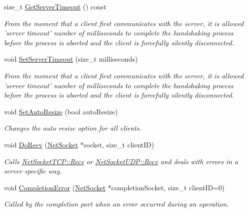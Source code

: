 \begin{DoxyCompactItemize}
size\_\-t \hyperlink{class_net_instance_server_a2f6d9df5a672c6f94892e11d41101756}{GetServerTimeout} () const 
\begin{DoxyCompactList}\small\item\em From the moment that a client first communicates with the server, it is allowed 'server timeout' number of milliseconds to complete the handshaking process before the process is aborted and the client is forcefully silently disconnected. \item\end{DoxyCompactList}\item 
void \hyperlink{class_net_instance_server_a1b7871958d05e1e0e9f3e683dcc8162b}{SetServerTimeout} (size\_\-t milliseconds)
\begin{DoxyCompactList}\small\item\em From the moment that a client first communicates with the server, it is allowed 'server timeout' number of milliseconds to complete the handshaking process before the process is aborted and the client is forcefully silently disconnected. \item\end{DoxyCompactList}\item 
void \hyperlink{class_net_instance_server_ae9f855ae23ae42a4c648957ca1a6107b}{SetAutoResize} (bool autoResize)
\begin{DoxyCompactList}\small\item\em Changes the auto resize option for all clients. \item\end{DoxyCompactList}\item 
void \hyperlink{class_net_instance_server_a1df65dc8572fc44730e5dd76e5aeabfe}{DoRecv} (\hyperlink{class_net_socket}{NetSocket} $\ast$socket, size\_\-t clientID)
\begin{DoxyCompactList}\small\item\em Calls \hyperlink{class_net_socket_t_c_p_a11891910910477cf1eba5fffef8bda52}{NetSocketTCP::Recv} or \hyperlink{class_net_socket_u_d_p_a5b7438968a34510997e9db862e00139b}{NetSocketUDP::Recv} and deals with errors in a server specific way. \item\end{DoxyCompactList}\item 
void \hyperlink{class_net_instance_server_a6a1425669efcbb0e36bddb6394e79f57}{CompletionError} (\hyperlink{class_net_socket}{NetSocket} $\ast$completionSocket, size\_\-t clientID=0)
\begin{DoxyCompactList}\small\item\em Called by the completion port when an error occurred during an operation. \item\end{DoxyCompactList}\item 

\end{DoxyCompactItemize}
